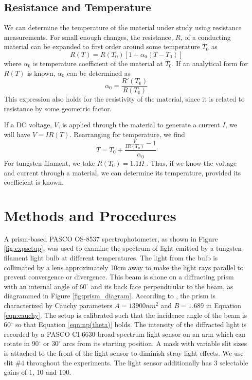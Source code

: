 \documentclass[
	a4paper, %
	10pt, %
	twoside, %
]{journal}
\begin{document}
\subsection{Resistance and Temperature}
We can determine the temperature of the material under study using resistance measurements. For small enough changes, the resistance, $R$, of a conducting material can be expanded to first order around some temperature $T_0$ as 
\begin{equation}
    \label{eqn:R(T)_firstorder}
    R(T) = R(T_0)[1 + \alpha_0(T - T_0)]
\end{equation}
where $\alpha_0$ is temperature coefficient of the material at $T_0$. If an analytical form for $R(T)$ is known, $\alpha_0$ can be determined as 
\begin{equation}
    \label{eqn:alpha0}
    \alpha_0 = \frac{R'(T_0)}{R(T_0)}
\end{equation}
This expression also holds for the resistivity of the material, since it is related to resistance by some geometric factor. 

If a DC voltage, $V$, is applied through the material to generate a current $I$, we will have $V = IR(T)$. Rearranging for temperature, we find 
\begin{equation}
    \label{eqn:T(V,I)}
    T = T_0 + \frac{\frac{V}{IR(T_0)} - 1}{\alpha_0}
\end{equation}
For tungsten filament, we take $R(T_0) = 1.1\Omega$ \autocite{bbody324labmanual}. Thus, if we know the voltage and current through a material, we can determine its temperature, provided its coefficient is known. 

\section{Methods and Procedures}
A prism-based PASCO OS-8537 spectrophotometer, as shown in Figure \ref{fig:expsetup}, was used to examine the spectrum of light emitted by a tungsten-filament light bulb at different temperatures. The light from the bulb is collimated by a lens approximately 10cm away to make the light rays parallel to prevent convergence or divergence. This beam is shone on a diffracting prism with an internal angle of $60^\circ$ and its back face perpendicular to the beam, as diagrammed in Figure \ref{fig:prism_diagram}. According to \cite{bbody324labmanual}, the prism is characterized by Cauchy parameters $A = 13900\unit{nm^2}$ and $B = 1.689$ in Equation \ref{eqn:cauchy}. The setup is calibrated such that the incidence angle of the beam is 60$^\circ$ so that Equation \ref{eqn:np(theta)} holds. The intensity of the diffracted light is recorded by a PASCO CI-6630 broad spectrum light sensor on an arm which can rotate in 90$^\circ$ or $30^\circ$ arcs from its starting position. A mask with variable slit sizes is attached to the front of the light sensor to diminish stray light effects. We use slit \#4 throughout the experiments. The light sensor additionally has 3 selectable gains of 1, 10 and 100.  
\end{document}
